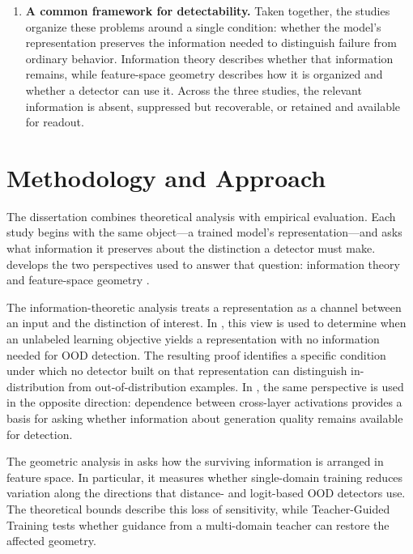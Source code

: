 \begin{enumerate}
  \item \textbf{A common framework for detectability.}
  Taken together, the studies organize these problems around a single
  condition: whether the model's representation preserves the information
  needed to distinguish failure from ordinary behavior. Information theory
  describes whether that information remains, while feature-space geometry
  describes how it is organized and whether a detector can use it. Across the
  three studies, the relevant information is absent, suppressed but
  recoverable, or retained and available for readout.
\end{enumerate}

\section{Methodology and Approach}
\label{sec:intro:methodology}

The dissertation combines theoretical analysis with empirical evaluation. Each
study begins with the same object---a trained model's representation---and asks
what information it preserves about the distinction a detector must make.
 develops the two perspectives used to answer that question:
information theory and feature-space geometry
\citep{shannon1948mathematical,cover1999elements,tishby2000information}.

The information-theoretic analysis treats a representation as a channel between
an input and the distinction of interest. In , this view
is used to determine when an unlabeled learning objective yields a representation
with no information needed for OOD detection. The resulting proof identifies a
specific condition under which no detector built on that representation can
distinguish in-distribution from out-of-distribution examples.
In , the same perspective is used in the opposite
direction: dependence between cross-layer activations provides a basis for asking
whether information about generation quality remains available for detection.

The geometric analysis in  asks how the
surviving information is arranged in feature space. In particular, it measures
whether single-domain training reduces variation along the directions that
distance- and logit-based OOD detectors use. The theoretical bounds describe
this loss of sensitivity, while Teacher-Guided Training tests whether guidance
from a multi-domain teacher can restore the affected geometry.

